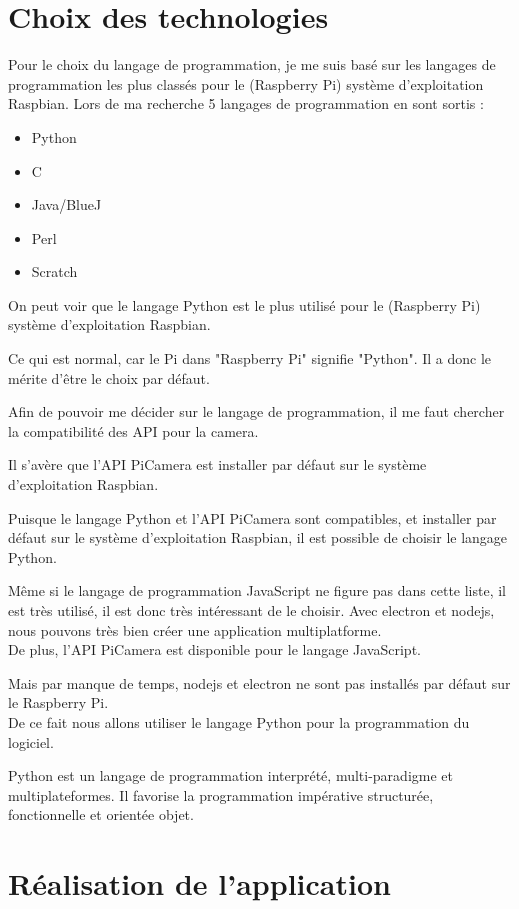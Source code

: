     \section{Choix des technologies}
    Pour le choix du langage de programmation, je me suis basé sur les langages de programmation les plus classés pour le (Raspberry Pi) système d'exploitation Raspbian.
    Lors de ma recherche 5 langages de programmation en sont sortis : 

    \vspace{0.2cm}

    \begin{itemize}
        \item Python
        \item C
        \item Java/BlueJ
        \item Perl
        \item Scratch
    \end{itemize}

    \begin{flushleft}
        On peut voir que le langage Python est le plus utilisé pour le (Raspberry Pi) système d'exploitation Raspbian.

        Ce qui est normal, car le Pi dans "Raspberry Pi" signifie "Python". Il a donc le mérite d'être le choix par défaut.

        Afin de pouvoir me décider sur le langage de programmation, il me faut chercher la compatibilité des API pour la camera. 

        Il s'avère que l'API PiCamera est installer par défaut sur le système d'exploitation Raspbian.

        Puisque le langage Python et l'API PiCamera sont compatibles, et installer par défaut sur le système d'exploitation Raspbian, il est possible de choisir le langage Python.
    
        Même si le langage de programmation JavaScript ne figure pas dans cette liste, il est très utilisé, il est donc très intéressant de le choisir.
        Avec electron et nodejs, nous pouvons très bien créer une application multiplatforme.\\[0.2cm]
        De plus, l'API PiCamera est disponible pour le langage JavaScript.
    
        Mais par manque de temps, nodejs et electron ne sont pas installés par défaut sur le Raspberry Pi.\\[0.2cm]
    
        De ce fait nous allons utiliser le langage Python pour la programmation du logiciel.
        
        Python est un langage de programmation interprété, multi-paradigme et multiplateformes. Il favorise la programmation impérative structurée, fonctionnelle et orientée objet.
    
    \end{flushleft}

    
    \section{Réalisation de l'application}
    
        
        